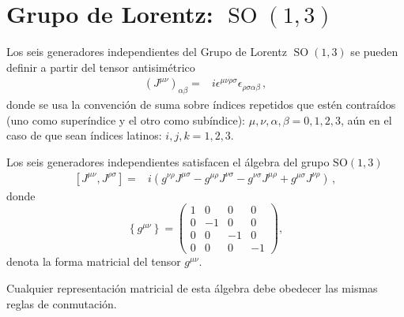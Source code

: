 \section{Grupo de Lorentz: $\operatorname{SO}(1,3)$}
\label{sec:glso13}

\begin{frame}
  Los seis generadores independientes del Grupo de Lorentz $\operatorname{SO}(1,3)$ se pueden definir a partir del tensor antisimétrico
\begin{align}
   \left(J^{\mu\nu}\right)_{\alpha\beta}=&i\epsilon^{\mu\nu\rho\sigma}\epsilon_{\rho\sigma\alpha\beta}\,,
\end{align}
donde se usa la convención de suma sobre índices repetidos que estén contraídos (uno como superíndice y el otro como subíndice): $\mu,\nu,\alpha,\beta=0,1,2,3$, aún en el caso de que sean índices latinos: $i,j,k=1,2,3$. 


Los seis generadores independientes satisfacen el álgebra del grupo $\operatorname{SO(1,3)}$
\begin{align}
\label{eq:lrtalg}
  \left[{J}^{\mu\nu},{J}^{\rho\sigma}\right]=&
i(g^{\nu\rho}{J}^{\mu\sigma}-g^{\mu\rho}{J}^{\nu\sigma}-g^{\nu\sigma}{J}^{\mu\rho}+g^{\mu\sigma}{J}^{\nu\rho})\,,
\end{align}
donde 
\begin{equation}
  \left\{ g^{\mu\nu} \right\}=
  \begin{pmatrix}
    1&0&0&0\\
    0&-1&0&0\\
    0&0&-1&0\\
    0&0&0&-1
  \end{pmatrix},
\end{equation}
denota la forma matricial del tensor $g^{\mu\nu}$.  


Cualquier representación matricial de esta álgebra debe obedecer las mismas reglas de conmutación.


\end{frame}
